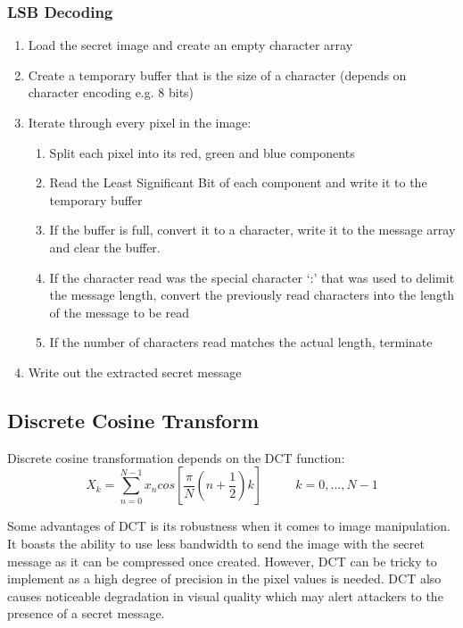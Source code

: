 \documentclass[11pt,letterpaper]{article}
\begin{document}
\subsubsection{LSB Decoding}
\begin{enumerate}
	\setlength\itemsep{0pt}

	\item Load the secret image and create an empty character array
	\item Create a temporary buffer that is the size of a character (depends on character encoding e.g. 8 bits)
	\item Iterate through every pixel in the image:
	\begin{enumerate}
		\setlength\itemsep{0pt}
		\item Split each pixel into its red, green and blue components
		\item Read the Least Significant Bit of each component and write it to the temporary buffer
		\item If the buffer is full, convert it to a character, write it to the message array and clear the buffer.
		\item If the character read was the special character ‘:’ that was used to delimit the message length, convert the previously read characters into the length of the message to be read
		\item If the number of characters read matches the actual length, terminate
	\end{enumerate}	
	\item Write out the extracted secret message
\end{enumerate}

\subsection{Discrete Cosine Transform}
Discrete cosine transformation depends on the DCT function:
$$ X_k = \sum_{n=0}^{N-1} x_n cos \left[ \frac{\pi}{N}\left(n+\frac{1}{2}\right)k\right]\ \ \ \ \ \ \ \ \ \ \ \  k=0,...,N-1$$

Some advantages of DCT is its robustness when it comes to image manipulation. It boasts the ability to use less bandwidth to send the image with the secret message as it can be compressed once created. However, DCT can be tricky to implement as a high degree of precision in the pixel values is needed. DCT also causes noticeable degradation in visual quality which may alert attackers to the presence of a secret message. 
\end{document}
